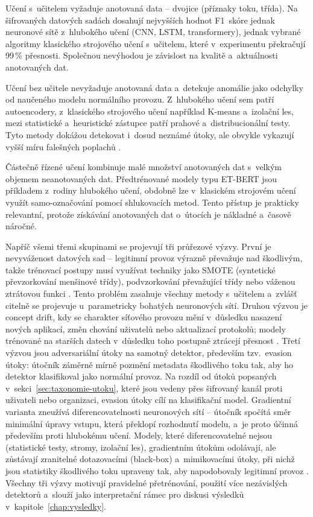 Učení s~učitelem vyžaduje anotovaná data -- dvojice (příznaky toku, třída). Na šifrovaných datových sadách dosahují nejvyšších hodnot F1~skóre jednak neuronové sítě z~hlubokého učení (CNN, LSTM, transformery), jednak vybrané algoritmy klasického strojového učení s~učitelem, které v~experimentu \textcite{Barut2020} překračují 99\,\% přesnosti. Společnou nevýhodou je závislost na kvalitě a~aktuálnosti anotovaných dat.

Učení bez učitele nevyžaduje anotovaná data a~detekuje anomálie jako odchylky od naučeného modelu normálního provozu. Z~hlubokého učení sem patří autoencodery, z~klasického strojového učení například K-means a~izolační les, mezi statistické a~heuristické zástupce patří prahové a~distribucionální testy. Tyto metody dokážou detekovat i~dosud neznámé útoky, ale obvykle vykazují vyšší míru falešných poplachů \parencite{Ji2024}.

Částečně řízené učení kombinuje malé množství anotovaných dat s~velkým objemem neanotovaných dat. Předtrénované modely typu ET-BERT \parencite{Lin2022} jsou příkladem z~rodiny hlubokého učení, obdobně lze v~klasickém strojovém učení využít samo-označování pomocí shlukovacích metod. Tento přístup je prakticky relevantní, protože získávání anotovaných dat o~útocích je nákladné a~časově náročné.

Napříč všemi třemi skupinami se projevují tři průřezové výzvy. První je nevyváženost datových sad -- legitimní provoz výrazně převažuje nad škodlivým, takže trénovací postupy musí využívat techniky jako SMOTE (syntetické převzorkování menšinové třídy), podvzorkování převažující třídy nebo váženou ztrátovou funkci \parencite{OzkanOkay2021}. Tento problém zasahuje všechny metody s~učitelem a~zvlášť citelně se projevuje u~parametricky bohatých neuronových sítí. Druhou výzvou je concept drift, kdy se charakter síťového provozu mění v~důsledku nasazení nových aplikací, změn chování uživatelů nebo aktualizací protokolů; modely trénované na starších datech v~důsledku toho postupně ztrácejí přesnost \parencite{Qing2025}. Třetí výzvou jsou adversariální útoky na samotný detektor, především tzv.~evasion útoky: útočník záměrně mírně pozmění metadata škodlivého toku tak, aby ho detektor klasifikoval jako normální provoz. Na rozdíl od útoků popsaných v~sekci~\ref{sec:taxonomie-utoku}, které jsou vedeny přes šifrovaný kanál proti uživateli nebo organizaci, evasion útoky cílí na klasifikační model. Gradientní varianta zneužívá diferencovatelnosti neuronových sítí -- útočník spočítá směr minimální úpravy vstupu, která překlopí rozhodnutí modelu, a~je proto účinná především proti hlubokému učení. Modely, které diferencovatelné nejsou (statistické testy, stromy, izolační les), gradientním útokům odolávají, ale zůstávají zranitelné dotazovacími (black-box) a~mimikovacími útoky, při nichž jsou statistiky škodlivého toku upraveny tak, aby napodobovaly legitimní provoz \parencite{He2023}. Všechny tři výzvy motivují pravidelné přetrénování, použití více nezávislých detektorů a~slouží jako interpretační rámec pro diskusi výsledků v~kapitole~\ref{chap:vysledky}.

